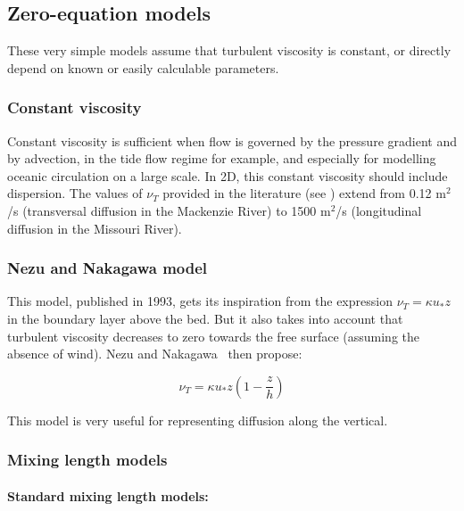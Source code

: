 \subsection{\label{turbulence 0 equation}Zero-equation models}

These very simple models assume that turbulent viscosity is constant, or
directly depend on known or easily calculable parameters.

\subsubsection{Constant viscosity}

Constant viscosity is sufficient when flow is governed by the pressure
gradient and by advection, in the tide flow regime for example, and especially
for modelling oceanic circulation on a large scale. In 2D, this constant
viscosity should include dispersion. The values of $\nu_T$ provided in the
literature (see \cite{fischer79}) extend from 0.12 m$^{2}$/s (transversal
diffusion in the Mackenzie River) to 1500 m$^{2}$/s (longitudinal diffusion in
the Missouri River).

\subsubsection{Nezu and Nakagawa model \cite{nezu93}%
}

This model, published in 1993, gets its inspiration from the expression
$\nu_T=\kappa u_{\ast}z$ in the boundary layer above the bed. But it also
takes into account that turbulent viscosity decreases to zero towards the free
surface (assuming the absence of wind). Nezu and Nakagawa \cite{nezu93}\ then propose:%

\begin{equation}
  \nu_T=\kappa u_{\ast}z\left(  1-\dfrac{z}{h}\right)
\end{equation}


This model is very useful for representing diffusion along the vertical.

\subsubsection{\label{longueurs de melange}Mixing length models%
}

\paragraph{Standard mixing length models:}

